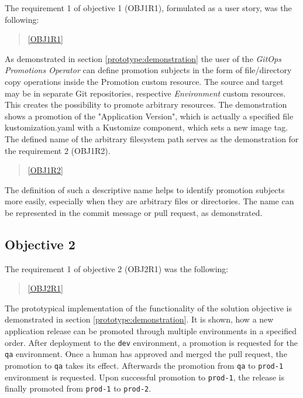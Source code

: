 The requirement 1 of objective 1 (OBJ1R1), formulated as a user story,
was the following:

\begin{quotation}
	\noindent
	\ref{OBJ1R1}
\end{quotation}

As demonstrated in section
\ref{prototype:demonstration}
the user of the \textit{GitOps Promotions Operator} can define promotion subjects
in the form of file/directory copy operations inside the Promotion custom resource.
The source and target may be in separate Git repositories, respective \textit{Environment} custom resources.
This creates the possibility to promote arbitrary resources.
The demonstration shows a promotion of the "Application Version",
which is actually a specified file kustomization.yaml with a Kustomize component,
which sets a new image tag.
The defined name of the arbitrary filesystem path serves as the demonstration for the requirement 2 (OBJ1R2).

\begin{quotation}
	\noindent
	\ref{OBJ1R2}
\end{quotation}

The definition of such a descriptive name helps to identify promotion subjects more easily, especially when
they are arbitrary files or directories. The name can be represented in the commit message or pull request, as demonstrated.

\subsection*{Objective 2}

The requirement 1 of objective 2 (OBJ2R1) was the following:

\begin{quotation}
	\noindent
	\ref{OBJ2R1}
\end{quotation}

The prototypical implementation of the functionality of the solution objective is demonstrated in section
\ref{prototype:demonstration}.
It is shown, how a new application release can be promoted through multiple environments in a specified order.
After deployment to the \lstinline|dev| environment, a promotion is requested for the \lstinline|qa| environment.
Once a human has approved and merged the pull request, the promotion to \lstinline|qa| takes its effect.
Afterwards the promotion from \lstinline|qa| to \lstinline|prod-1| environment is requested. Upon successful promotion to \lstinline|prod-1|,
the release is finally promoted from \lstinline|prod-1| to \lstinline|prod-2|.

